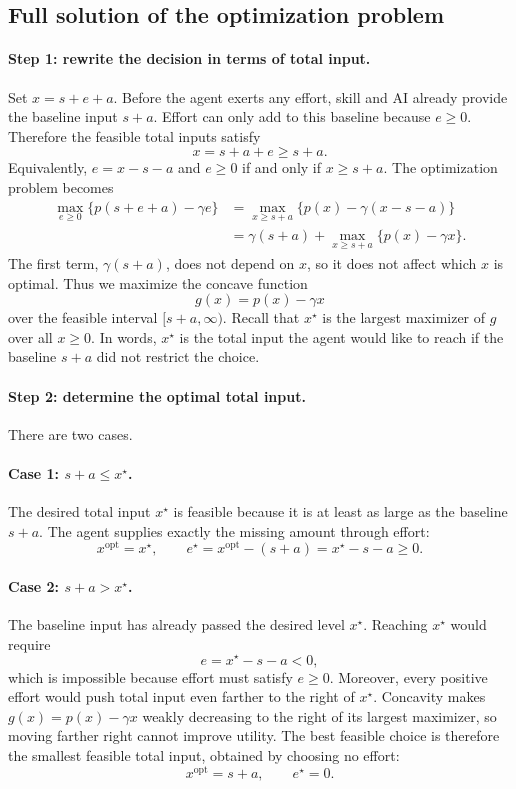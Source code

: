\documentclass[11pt]{article}
\theoremstyle{tutorial}
\theoremstyle{remark}
\newcommand{\1}{\mathbb{I}}
\begin{document}
\subsection{Full solution of the optimization problem}

\paragraph{Step 1: rewrite the decision in terms of total input.}
Set $x=s+e+a$.  Before the agent exerts any effort, skill and AI already provide the baseline input
$s+a$.  Effort can only add to this baseline because $e\ge0$.  Therefore the feasible total inputs satisfy
\[
  x=s+a+e\ge s+a.
\]
Equivalently, $e=x-s-a$ and $e\ge0$ if and only if $x\ge s+a$.  The optimization problem becomes
\begin{align*}
  \max_{e\ge0}\{p(s+e+a)-\gamma e\}
  &=\max_{x\ge s+a}\{p(x)-\gamma(x-s-a)\}\\
  &=\gamma(s+a)+\max_{x\ge s+a}\{p(x)-\gamma x\}.
\end{align*}
The first term, $\gamma(s+a)$, does not depend on $x$, so it does not affect which $x$ is optimal.  Thus
we maximize the concave function
\[
  g(x)=p(x)-\gamma x
\]
over the feasible interval $[s+a,\infty)$.  Recall that $x^\star$ is the largest maximizer of $g$ over all
$x\ge0$.  In words, $x^\star$ is the total input the agent would like to reach if the baseline $s+a$ did
not restrict the choice.

\paragraph{Step 2: determine the optimal total input.}
There are two cases.

\paragraph{Case 1: $s+a\le x^\star$.}
The desired total input $x^\star$ is feasible because it is at least as large as the baseline $s+a$.
The agent supplies exactly the missing amount through effort:
\[
  x^{\mathrm{opt}}=x^\star,
  \qquad
  e^\star=x^{\mathrm{opt}}-(s+a)=x^\star-s-a\ge0.
\]

\paragraph{Case 2: $s+a>x^\star$.}
The baseline input has already passed the desired level $x^\star$.  Reaching $x^\star$ would require
\[
  e=x^\star-s-a<0,
\]
which is impossible because effort must satisfy $e\ge0$.  Moreover, every positive effort would push total
input even farther to the right of $x^\star$.  Concavity makes $g(x)=p(x)-\gamma x$ weakly decreasing to
the right of its largest maximizer, so moving farther right cannot improve utility.  The best feasible choice
is therefore the smallest feasible total input, obtained by choosing no effort:
\[
  x^{\mathrm{opt}}=s+a,
  \qquad
  e^\star=0.
\]
\end{document}
